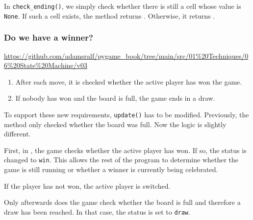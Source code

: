 
In \texttt{check\_ending()}, we simply check whether there is still a cell whose value is \texttt{None}. If such a cell exists, the method returns \false{}. Otherwise, it returns \true{}.





\subsubsection{Do we have a winner?}
\begin{diskbox}
	\url{https://github.com/adamsralf/pygame_book/tree/main/src/01%20Techniques/06%20State%20Machine/v03}
\end{diskbox}

\begin{enumerate}
	\item After each move, it is checked whether the active player has won the game.\label{reqTicTacToeWinOrDrawWin}

	\item If nobody has won and the board is full, the game ends in a draw.\label{reqTicTacToeWinOrDrawDraw}
\end{enumerate}
\er

To support these new requirements, \texttt{update()} has to be modified. Previously, the method only checked whether the board was full. Now the logic is slightly different.

First, in , the game checks whether the active player has won. If so, the status is changed to \texttt{win}. This allows the rest of the program to determine whether the game is still running or whether a winner is currently being celebrated.

If the player has not won, the active player is switched.

Only afterwards does the game check whether the board is full and therefore a draw has been reached. In that case, the status is set to \texttt{draw}.



